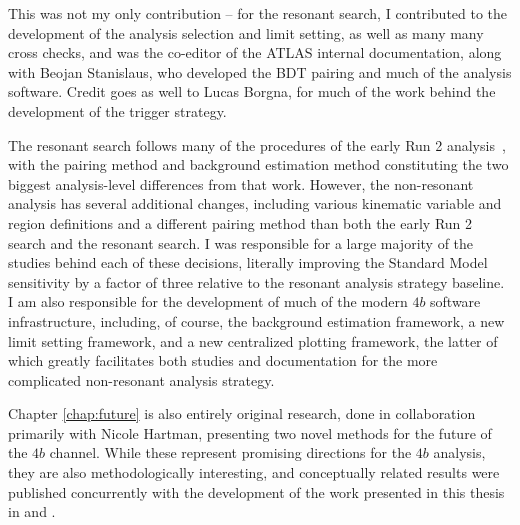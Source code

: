 This was not my only contribution -- for the resonant search, I contributed to the development of the analysis selection 
and limit setting, as well as many many cross checks, and was the co-editor of the ATLAS internal documentation, along with 
Beojan Stanislaus, who developed the BDT pairing and much of the analysis software. Credit goes as well to Lucas Borgna, 
for much of the work behind the development of the trigger strategy.

The resonant search follows many of the procedures of the early Run 2 analysis~\cite{EXOT-2016-31}, 
with the pairing method and background estimation method 
constituting the two biggest analysis-level differences from that work. However, the non-resonant analysis has 
several additional changes, including various kinematic variable and region definitions 
and a different pairing method than both the early Run 2 search and the resonant search. I was responsible for a 
large majority of the studies behind each of these decisions, literally improving the Standard Model sensitivity 
by a factor of three relative to the resonant analysis strategy baseline. I am also responsible for the development 
of much of the modern $4b$ software infrastructure, 
including, of course, the background estimation framework, a new limit setting framework, and a new centralized plotting 
framework, the latter of which greatly facilitates both studies and documentation for the more complicated 
non-resonant analysis strategy.

Chapter \ref{chap:future} is also entirely original research, done in collaboration primarily with Nicole Hartman, presenting two novel methods for the future of the $4b$ channel. While these represent promising directions 
for the $4b$ analysis, they are also methodologically interesting, and conceptually related results were published 
concurrently with the development of the work presented in this thesis in \cite{SPANet} and \cite{Astro-NSF}.
